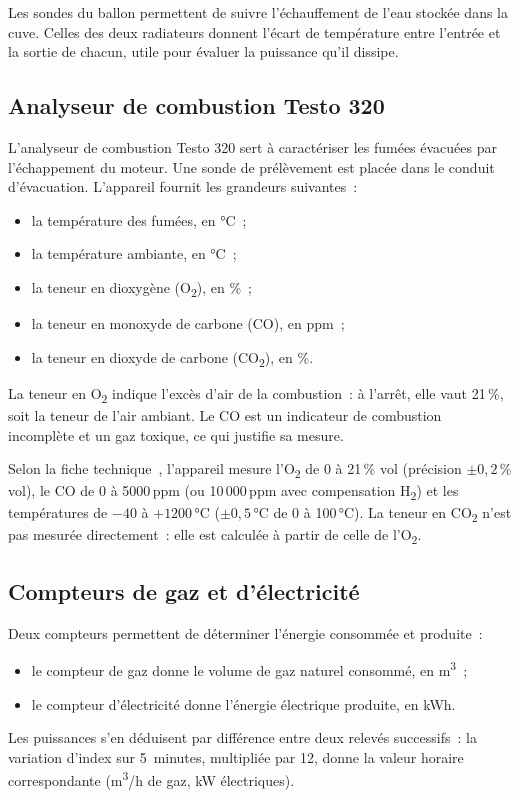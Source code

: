 Les sondes du ballon permettent de suivre l'échauffement de l'eau stockée dans la cuve. Celles des deux radiateurs donnent l'écart de température entre l'entrée et la sortie de chacun, utile pour évaluer la puissance qu'il dissipe.

\subsection{Analyseur de combustion Testo 320}
\label{subsec:testo-320}

L'analyseur de combustion Testo 320 sert à caractériser les fumées évacuées par l'échappement du moteur. Une sonde de prélèvement est placée dans le conduit d'évacuation. L'appareil fournit les grandeurs suivantes~:
\begin{itemize}
  \item la température des fumées, en °C~;
  \item la température ambiante, en °C~;
  \item la teneur en dioxygène (O\textsubscript{2}), en \%~;
  \item la teneur en monoxyde de carbone (CO), en ppm~;
  \item la teneur en dioxyde de carbone (CO\textsubscript{2}), en \%.
\end{itemize}
La teneur en O\textsubscript{2} indique l'excès d'air de la combustion~: à l'arrêt, elle vaut 21\,\%, soit la teneur de l'air ambiant. Le CO est un indicateur de combustion incomplète et un gaz toxique, ce qui justifie sa mesure.

Selon la fiche technique~\cite{testo320}, l'appareil mesure l'O\textsubscript{2} de 0 à 21\,\% vol (précision $\pm0{,}2$\,\% vol), le CO de 0 à 5000\,ppm (ou 10\,000\,ppm avec compensation H\textsubscript{2}) et les températures de $-40$ à $+1200$\,°C ($\pm0{,}5$\,°C de 0 à 100\,°C). La teneur en CO\textsubscript{2} n'est pas mesurée directement~: elle est calculée à partir de celle de l'O\textsubscript{2}.
\subsection{Compteurs de gaz et d'électricité}
\label{subsec:compteurs}

Deux compteurs permettent de déterminer l'énergie consommée et produite~:
\begin{itemize}
  \item le compteur de gaz donne le volume de gaz naturel consommé, en m\textsuperscript{3}~;
  \item le compteur d'électricité donne l'énergie électrique produite, en kWh.
\end{itemize}
Les puissances s'en déduisent par différence entre deux relevés successifs~: la variation d'index sur 5~minutes, multipliée par 12, donne la valeur horaire correspondante (m\textsuperscript{3}/h de gaz, kW électriques).

